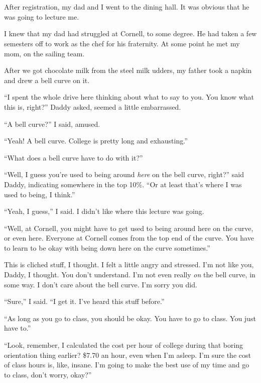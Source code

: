 \section{}

After registration, my dad and I went to the dining hall.  It was obvious that
he was going to lecture me.  

I knew that my dad had struggled at Cornell, to some degree.  He had taken a few
semesters off to work as the chef for his fraternity.  At some point he met
my mom, on the sailing team.  

After we got chocolate milk from the steel milk udders, my father took a napkin and
drew a bell curve on it.

``I spent the whole drive here thinking about what to say to you.  You know what
this is, right?'' Daddy asked, seemed a little embarrassed.

``A bell curve?'' I said, amused.

``Yeah!  A bell curve.  College is pretty long and exhausting.''  

``What does a bell curve have to do with it?''

``Well, I guess you're used to being around \textit{here} on the bell curve,
right?'' said Daddy, indicating somewhere in the top 10\%.  ``Or at least that's
where I was used to being, I think.''  

``Yeah, I guess,'' I said.  I didn't like where this lecture was going.

``Well, at Cornell, you might have to get used to being around here on the
curve, or even here.  Everyone at Cornell comes from the top end of the curve.
You have to learn to be okay with being down here on the curve sometimes.''

This is cliched stuff, I thought.  I felt a little angry and stressed.  I'm not
like you, Daddy, I thought.  You don't understand.  I'm not even really
\textit{on} the bell curve, in some way.  I don't care about the bell curve.
I'm sorry you did.

``Sure,'' I said.  ``I get it.  I've heard this stuff before.''

``As long as you go to class, you should be okay.  You have to go to class.  You
just have to.''

``Look, remember, I calculated the cost per hour of college during that boring
orientation thing earlier?  \$7.70 an hour, even when I'm asleep.  I'm sure the
cost of class hours is, like, insane.  I'm going to make the best use of my time
and go to class, don't worry, okay?''


